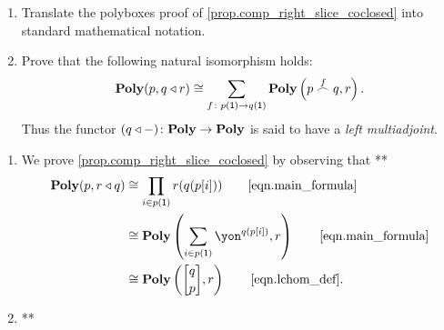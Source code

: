 \documentclass[Book-Poly]{subfiles}
\begin{document}
\begin{exercise} \label{exc.comp_right_slice_coclosed_calc}
\begin{enumerate}
    \item Translate the polyboxes proof of \cref{prop.comp_right_slice_coclosed} into standard mathematical notation.
    
    \item Prove that the following natural isomorphism holds:
    \begin{equation}
        \mathbf{Poly}(p,q\mathbin{\triangleleft} r)\cong\sum_{f\colon p(\textsf{1})\to q(\textsf{1})}\mathbf{Poly}\left(p\overset{f}{\frown}q,r\right).
    \end{equation}
    Thus the functor $(q\mathbin{\triangleleft}-)\colon\mathbf{Poly}\to\mathbf{Poly}$ is said to have a \emph{left multiadjoint}.
\end{enumerate}
\begin{solution}
\begin{enumerate}
    \item We prove \cref{prop.comp_right_slice_coclosed} by observing that **
    \begin{align*}
        \poly(p,r\tri q)&\iso\prod_{i\in p(\1)}r(q(p[i])) \tag*{\eqref{eqn.main_formula}} \\
        &\iso\poly\left(\sum_{i\in p(\1)}\yon^{q(p[i])}, r\right) \tag*{\eqref{eqn.main_formula}} \\
        &\iso\poly\left(\lchom{q}{p}, r\right) \tag*{\eqref{eqn.lchom_def}}.
    \end{align*}
    
    \item **
\end{enumerate}
\end{solution}
\end{exercise}
\end{document}
